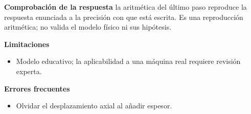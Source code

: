 \documentclass[10pt,openany]{book}
\begin{document}
\begin{tcolorbox}[title={Problema resuelto 4}, studiumworked, breakable]
\noindent\textbf{Comprobación de la respuesta} la aritmética del último paso reproduce la respuesta enunciada a la precisión con que está escrita. Es una reproducción aritmética; no valida el modelo físico ni sus hipótesis.

\noindent\textbf{Limitaciones}
\begin{itemize}
\item Modelo educativo; la aplicabilidad a una máquina real requiere revisión experta.
\end{itemize}

\noindent\textbf{Errores frecuentes}
\begin{itemize}
\item Olvidar el desplazamiento axial al añadir espesor.
\end{itemize}
\end{tcolorbox}
\end{document}

